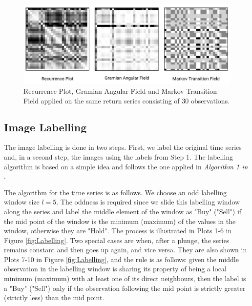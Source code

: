 \documentclass[12pt, a4paper]{article}
\begin{document}
\begin{figure}[ht]
    \centering
    \includegraphics[width=\textwidth]{images/allTrf.PNG}
    \caption{Recurrence Plot, Gramian Angular Field and Markov Transition Field applied on the same return series consisting of 30 observations.}
    \label{fig:allTrf}
\end{figure}

\subsection{Image Labelling}
\label{subsec:DM:IL}
The image labelling is done in two steps. First, we label the original time series and, in a second step, the images using the labels from Step 1.
The labelling algorithm is based on a simple idea and follows the one applied in \textit{Algorithm 1 in} \cite{sezer2018algorithmic}.

The algorithm for the time series is as follows. We choose an odd labelling window size $l = 5$. The oddness is required since we slide this labelling window along the series and label the middle element of the window as "Buy" ("Sell") if the mid point of the window is the minimum (maximum) of the values in the window, otherwise they are "Hold". The process is illustrated in Plots 1-6 in Figure \ref{fig:Labelling}. 
Two special cases are when, after a plunge, the series remains constant and then goes up again, and vice versa. They are also shown in Plots 7-10 in Figure \ref{fig:Labelling}, and the rule is as follows: 
given the middle observation in the labelling window is sharing its property of being a local minimum (maximum) with at least one of its direct neighbours, then the label is a "Buy" ("Sell") only if the observation following the mid point is strictly greater (strictly less) than the mid point.
\end{document}
